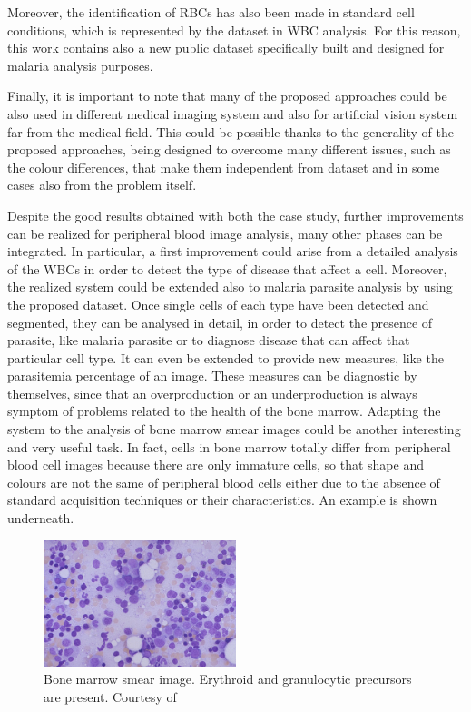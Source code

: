 \documentclass[final,a4paper,12pt,english]{UnicaPhdThesis3}
\begin{document}
Moreover, the identification of RBCs has also been made in standard cell conditions, which is represented by the dataset in WBC analysis. For this reason, this work contains also a new public dataset specifically built and designed for malaria analysis purposes.

Finally, it is important to note that many of the proposed approaches could be also used in different medical imaging system and also for artificial vision system far from the medical field. This could be possible thanks to the generality of the proposed approaches, being designed to overcome many different issues, such as the colour differences, that make them independent from dataset and in some cases also from the problem itself.

Despite the good results obtained with both the case study, further improvements can be realized for peripheral blood image analysis, many other phases can be integrated. 
In particular, a first improvement could arise from a detailed analysis of the WBCs in order to detect the type of disease that affect a cell. 
Moreover, the realized system could be extended also to malaria parasite analysis by using the proposed dataset. Once single cells of each type have been detected and segmented, they can be analysed in detail, in order to detect the presence of parasite, like malaria parasite or to diagnose disease that can affect that particular cell type.   
It can even be extended to provide new measures, like the parasitemia percentage of an image.
These measures can be diagnostic by themselves, since that an overproduction or an underproduction is always symptom of problems related to the health of the bone marrow. Adapting the system to the analysis of bone marrow smear images could be another interesting and very useful task. In fact, cells in bone marrow totally differ from peripheral blood cell images because there are only immature cells, so that shape and colours are not the same of peripheral blood cells either due to the absence of standard acquisition techniques or their characteristics. An example is shown underneath.

\begin{figure}[b]
	\centering
	\includegraphics[width=0.5\textwidth]{images/bone_marrow}
	\caption{\label{fig:bone_marrow} Bone marrow smear image. Erythroid and granulocytic precursors are present. Courtesy of \cite{Med_Utah}}
\end{figure}
\end{document}

